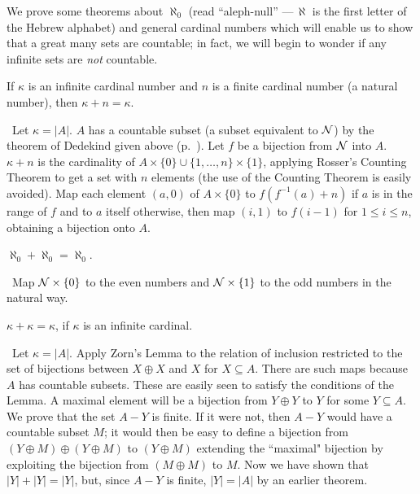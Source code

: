 We prove some theorems about $\aleph_0$ (read ``aleph-null'' ---\,$\aleph$ is
the first letter of the Hebrew alphabet) and general 
cardinal numbers which will enable us to show that a
great many sets are countable; in fact, we will begin to wonder if any infinite
sets are {\itshape not\/} countable.

\begin{thm}
 If $\kappa$ is an infinite cardinal number and $n$ is a finite
 cardinal number (a natural number), then $\kappa + n =
 \kappa$. 
\end{thm}

\preuve\ Let $\kappa = |A|$.  $A$ has a countable subset (a 
subset equivalent to ${\cal N}$) by the
theorem of Dedekind given 
above (p.~\pageref{thm-dedekind}).  Let $f$ be a bijection
from ${\cal N}$ into $A$.
$\kappa +   n$ is the cardinality of $A \times \{0\}
\cup \{1,\ldots,n\} \times \{1\}$, applying Rosser's Counting Theorem to get a set with $n$ elements (the use of the Counting
Theorem is easily avoided).  Map each element $(a,0)$ of $A \times \{0\}$ to
$f(f^{-1}(a) + n)$ if $a$ is in the range of $f$ and to $a$ itself otherwise,
then map $(i,1)$ to $f(i-1)$ for $1 \leq i \leq n$, obtaining a
bijection onto  $A$.
\finpreuve

\begin{thm}
 $\aleph_0 + \aleph_0 = \aleph_0$.
\end{thm}

\preuve\ Map ${\cal N} \times \{0\}$ to the even numbers and ${\cal N} \times
\{1\}$ to the odd numbers in the natural way.
\finpreuve

\begin{thm}
 $\kappa + \kappa = \kappa$, if $\kappa$ is an
 infinite cardinal.
\end{thm}

\preuve\ Let $\kappa = |A|$.  Apply Zorn's Lemma to the
relation of inclusion 
restricted to the set of bijections between $X \oplus X$ and
$X$ for $X \subseteq A$. 
There are such maps because $A$ has countable subsets.  These are easily
seen to satisfy the conditions of the Lemma.  A maximal element will
be a bijection from $Y \oplus Y$ to $Y$ for some $Y \subseteq A$.  We prove
that the set $A - Y$ is finite.  If it were not, then $A - Y$
would have a countable subset $M$; it would then be easy to define a bijection
from $(Y \oplus M) \oplus (Y \oplus M)$ to $(Y \oplus M)$ extending the
``maximal" bijection by exploiting the bijection from $(M \oplus M)$ to $M$.
Now we have shown that $|Y| + |Y| = |Y|$, but, since $A - Y$ is finite, $|Y| =
|A|$ by an earlier theorem.
\finpreuve

